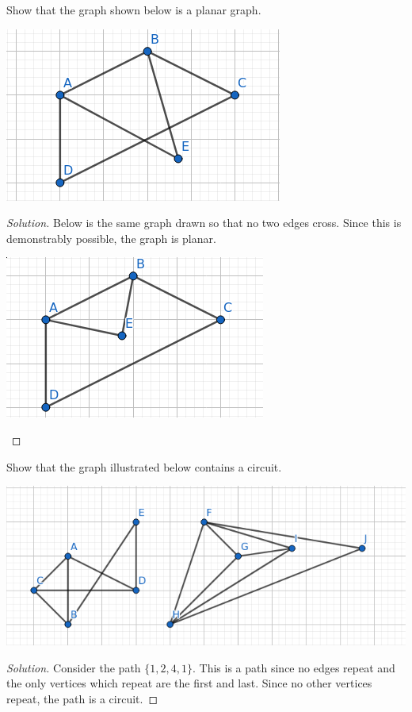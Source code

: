 \documentclass[12pt]{article}
\newenvironment{exercise}[2][Exercise]{\begin{trivlist}
        \item[\hskip \labelsep {\bfseries #1}\hskip \labelsep {\bfseries #2.}]}{\end{trivlist}}
\newenvironment{solution}
        {\begin{proof}[Solution]}
                    {\end{proof}}
\begin{document}
\begin{exercise}{49}
    Show that the graph shown below is a planar graph.
    \begin{center}
        \includegraphics[width=.5\linewidth]{49-1}
    \end{center}
    \begin{solution}
        Below is the same graph drawn so that no two edges cross. Since this is demonstrably possible, the graph is planar.
    \begin{center}
        \includegraphics[width=.5\linewidth]{49-2}
    \end{center}
    \end{solution}
\end{exercise}\pagebreak
\begin{exercise}{50}
    Show that the graph illustrated below contains a circuit.
    \begin{center}
        \includegraphics[width=.5\linewidth]{48}
    \end{center}
    \begin{solution}
        Consider the path \( \{1,2,4,1\} . \) This is a path since no edges repeat and the only vertices which repeat are the first and last. Since no other vertices repeat, the path is a circuit.
    \end{solution}
\end{exercise}
\end{document}
